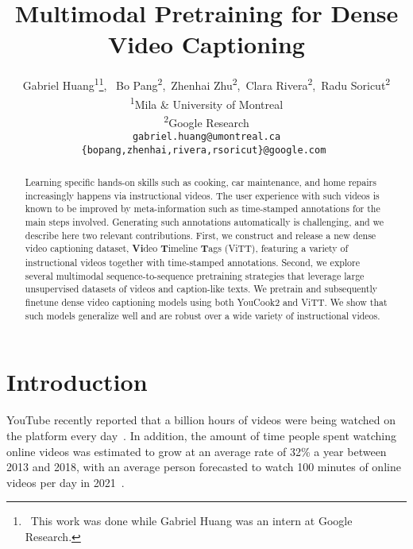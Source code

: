 \documentclass[11pt,a4paper]{article}
\title{Multimodal Pretraining for Dense Video Captioning}
\author{Gabriel Huang\textsuperscript{1}\thanks{\, This work was done while Gabriel Huang was an intern at Google Research.},
\, Bo Pang\textsuperscript{2},
\,Zhenhai Zhu\textsuperscript{2},
\,Clara Rivera\textsuperscript{2},
\,Radu Soricut\textsuperscript{2}\\
\textsuperscript{1}Mila \& University of Montreal\\
\textsuperscript{2}Google Research\\
\small
\texttt{gabriel.huang@umontreal.ca}\\
\small
\texttt{\{bopang,zhenhai,rivera,rsoricut\}@google.com }
}
\date{}
\begin{document}
\maketitle

\newcommand{\ldvm}{ViTT\xspace}
\newcommand{\ldvmlong}{Video Timeline Tags\xspace}
\newcommand{\ldvmmerged}{\ldvm-All\xspace}
\newcommand{\ldvmcooking}{\ldvm-Cooking\xspace}
\newcommand{\youcook}{YouCook2\xspace}
\newcommand{\ytdata}{YouTube-8M\xspace}
\newcommand{\ytdatasub}{YT8M-cook\xspace}
\newcommand{\youtube}{\ytdatasub\xspace}
\newcommand{\howtodata}{HowTo100M\xspace}
\newcommand{\howto}{HowTo100M\xspace}
\newcommand{\recipes}{Recipe1M\xspace}
\newcommand{\wikihow}{WikiHow\xspace}
\newcommand{\starburst}{Compact 2D\xspace}
\newcommand{\fnet}{FDense\xspace}
\newcommand{\unimt}{UniD\xspace}
\newcommand{\bimt}{BiD\xspace}
\newcommand{\bimtalt}{BiDalt\xspace}
\newcommand{\rouge}{{\sc{Rouge}}-L\xspace}
\newcommand{\bleu}{{\sc{Bleu}}\xspace}
\newcommand{\meteor}{{\sc{Meteor}}\xspace}
\newcommand{\cider}{{\sc{CIDEr}}\xspace}
\newcommand{\ASRtoASR}{\textsc{asr}\textsc{asr}\xspace}
\newcommand{\CAPtoCAP}{\textsc{cap}\textsc{cap}\xspace}
\newcommand{\ex}[4]{\adjustimage{width=0.19\textwidth,valign=M,frame}{#1}&\textit{#2}&\textit{#3}&\textit{#4}}
\newcommand{\good}{\textcolor{green!70!black}{(\textbf{good})}}
\newcommand{\ok}{\textcolor{orange}{(\textbf{ok})}}
\newcommand{\bad}{\textcolor{red}{(\textbf{bad})}} 
\begin{abstract}
Learning specific hands-on skills such as cooking, car maintenance, and home repairs increasingly happens via instructional videos.
The user experience with such videos is known to be improved by meta-information such as time-stamped annotations for the main steps involved.
Generating such annotations automatically is challenging, and we describe here two relevant contributions.
First, we construct and release a new dense video captioning dataset, \textbf{Vi}deo \textbf{T}imeline \textbf{T}ags (\ldvm), featuring a variety of instructional videos together with time-stamped annotations.
Second, we explore several multimodal sequence-to-sequence pretraining strategies that leverage large unsupervised datasets of videos and caption-like texts.
We pretrain and subsequently finetune dense video captioning models using both YouCook2 and ViTT.
We show that such models generalize well and are robust over a wide variety of instructional videos.
\end{abstract}


\section{Introduction}
YouTube recently reported that a billion hours of videos were being watched on the platform every day~\citep{youtubeblog}.
In addition, the amount of time people spent watching online videos was estimated to grow at an average rate of 32\% a year between 2013 and 2018, with an average person forecasted to watch 100 minutes of online videos per day in 2021~\citep{zenithmedia}.
\end{document}
